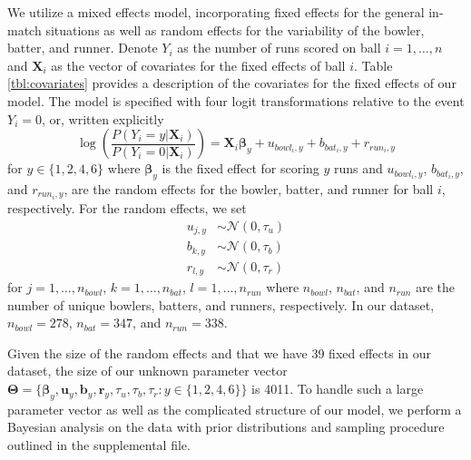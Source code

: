 \documentclass[
  12pt,
]{article}
\begin{document}
We utilize a mixed effects model, incorporating fixed effects for the
general in-match situations as well as random effects for the
variability of the bowler, batter, and runner. Denote \(Y_i\) as the
number of runs scored on ball \(i = 1,\dots,n\) and \(\boldsymbol{X}_i\)
as the vector of covariates for the fixed effects of ball \(i\). Table
\ref{tbl:covariates} provides a description of the covariates for the
fixed effects of our model. The model is specified with four logit
transformations relative to the event \(Y_i = 0\), or, written
explicitly \begin{equation}
\log\left(\frac{P(Y_i = y | \boldsymbol{X}_i)}{P(Y_i = 0 | \boldsymbol{X}_i)}\right) = \boldsymbol{X}_i \boldsymbol{\beta}_y + u_{bowl_i,y} + b_{bat_i,y} + r_{run_i,y} \label{model}
\end{equation} for \(y \in \{1,2,4,6\}\) where \(\boldsymbol{\beta}_y\)
is the fixed effect for scoring \(y\) runs and \(u_{bowl_i,y}\),
\(b_{bat_i,y}\), and \(r_{run_i,y}\), are the random effects for the
bowler, batter, and runner for ball \(i\), respectively. For the random
effects, we set \begin{align}
u_{j,y} & \sim \mathcal{N}(0,\tau_u) \nonumber \\
b_{k,y} & \sim \mathcal{N}(0,\tau_b) \nonumber \\
r_{l,y} & \sim \mathcal{N}(0,\tau_r) \label{rand_eff}
\end{align} for \(j = 1,\dots,n_{bowl}\), \(k = 1,\dots,n_{bat}\),
\(l = 1,\dots,n_{run}\) where \(n_{bowl}\), \(n_{bat}\), and \(n_{run}\)
are the number of unique bowlers, batters, and runners, respectively. In
our dataset, \(n_{bowl} = 278\), \(n_{bat} = 347\), and
\(n_{run} = 338\).

Given the size of the random effects and that we have 39 fixed effects
in our dataset, the size of our unknown parameter vector
\(\boldsymbol{\Theta} = \{\boldsymbol{\beta}_y, \boldsymbol{u}_y,\boldsymbol{b}_y,\boldsymbol{r}_y,\tau_u,\tau_b,\tau_r: y \in \{1,2,4,6\}\}\)
is 4011. To handle such a large parameter vector as well as the
complicated structure of our model, we perform a Bayesian analysis on
the data with prior distributions and sampling procedure outlined in the
supplemental file.
\end{document}
